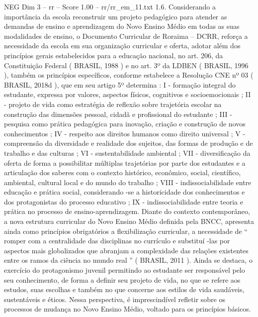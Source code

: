\begin{textsample}{NEG Dim 3 – rr – Score 1.00 – rr/rr\_em\_11.txt}  \label{ex:f3_neg_070}
1.6.
Considerando a importância da escola reconstruir um projeto pedagógico para atender as demandas de ensino e aprendizagem do Novo Ensino Médio em todas as suas modalidades de ensino, o Documento Curricular de Roraima – DCRR, reforça a necessidade da escola em sua organização curricular e oferta, adotar além dos princípios gerais estabelecidos para a educação nacional, no art. 206, da Constituição Federal ( BRASIL, 1988 ) e no art. 3º da LDBEN ( BRASIL, 1996 ), também os princípios específicos, conforme estabelece a Resolução CNE nº 03 ( BRASIL, 2018d ), que em seu artigo 5º determina : I - formação integral do estudante, expressa por valores, aspectos físicos, cognitivos e socioemocionais ; II - projeto de vida como estratégia de reflexão sobre trajetória escolar na construção das dimensões pessoal, cidadã e profissional do estudante ; III - pesquisa como prática pedagógica para inovação, criação e construção de novos conhecimentos ; IV - respeito aos direitos humanos como direito universal ; V - compreensão da diversidade e realidade dos sujeitos, das formas de produção e de trabalho e das culturas ; VI - sustentabilidade ambiental ; VII - diversificação da oferta de forma a possibilitar múltiplas trajetórias por parte dos estudantes e a articulação dos saberes com o contexto histórico, econômico, social, científico, ambiental, cultural local e do mundo do trabalho ; VIII - indissociabilidade entre educação e prática social, considerando -se a historicidade dos conhecimentos e dos protagonistas do processo educativo ; IX - indissociabilidade entre teoria e prática no processo de ensino-aprendizagem.
Diante do contexto contemporâneo, a nova estrutura curricular do Novo Ensino Médio definida pela BNCC, apresenta ainda como princípios obrigatórios a flexibilização curricular, a necessidade de “ romper com a centralidade das disciplinas no currículo e substituí -las por aspectos mais globalizados que abranjam a complexidade das relações existentes entre os ramos da ciência no mundo real ” ( BRASIL, 2011 ).
Ainda se destaca, o exercício do protagonismo juvenil permitindo ao estudante ser responsável pelo seu conhecimento, de forma a definir seu projeto de vida, no que se refere aos estudos, suas escolhas e também no que concerne aos estilos de vida saudáveis, sustentáveis e éticos.
Nessa perspectiva, é imprescindível refletir sobre os processos de mudança no Novo Ensino Médio, voltado para os princípios básicos.

\end{textsample}
